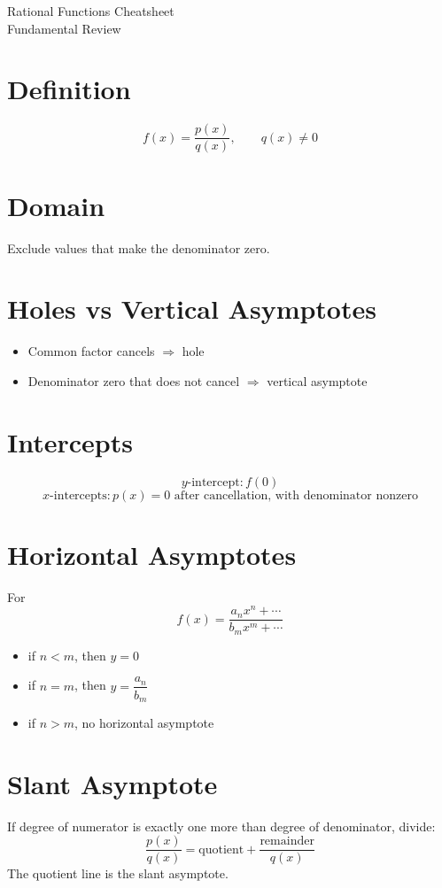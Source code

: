 \documentclass[11pt]{article}
\begin{document}
\begin{center}
{\LARGE Rational Functions Cheatsheet}\\[0.4em]
{\large Fundamental Review}
\end{center}

\section*{Definition}
\[
f(x)=\frac{p(x)}{q(x)},\qquad q(x)\ne 0
\]

\section*{Domain}
Exclude values that make the denominator zero.

\section*{Holes vs Vertical Asymptotes}
\begin{itemize}
  \item Common factor cancels $\Rightarrow$ hole
  \item Denominator zero that does not cancel $\Rightarrow$ vertical asymptote
\end{itemize}

\section*{Intercepts}
\[
y\text{-intercept}: f(0)
\]
\[
x\text{-intercepts}: p(x)=0 \text{ after cancellation, with denominator nonzero}
\]

\section*{Horizontal Asymptotes}
For
\[
f(x)=\frac{a_nx^n+\cdots}{b_mx^m+\cdots}
\]
\begin{itemize}
  \item if $n<m$, then $y=0$
  \item if $n=m$, then $y=\dfrac{a_n}{b_m}$
  \item if $n>m$, no horizontal asymptote
\end{itemize}

\section*{Slant Asymptote}
If degree of numerator is exactly one more than degree of denominator, divide:
\[
\frac{p(x)}{q(x)}=\text{quotient}+\frac{\text{remainder}}{q(x)}
\]
The quotient line is the slant asymptote.
\end{document}
